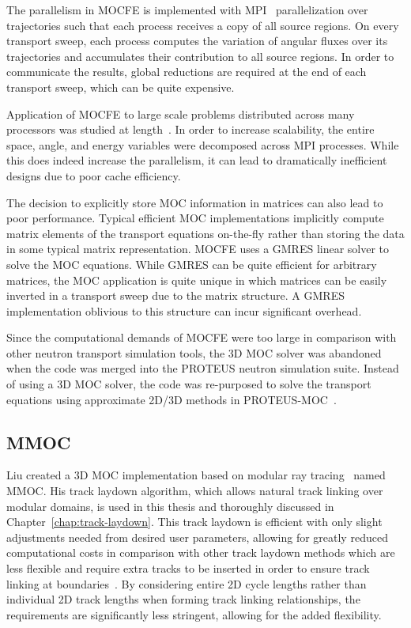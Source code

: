 The parallelism in MOCFE is implemented with \ac{MPI}~\cite{mpi} parallelization over trajectories such that each process receives a copy of all source regions. On every transport sweep, each process computes the variation of angular fluxes over its trajectories and accumulates their contribution to all source regions. In order to communicate the results, global reductions are required at the end of each transport sweep, which can be quite expensive.

Application of MOCFE to large scale problems distributed across many processors was studied at length~\cite{mocfe_bgp}. In order to increase scalability, the entire space, angle, and energy variables were decomposed across \ac{MPI} processes. While this does indeed increase the parallelism, it can lead to dramatically inefficient designs due to poor cache efficiency. 


The decision to explicitly store \ac{MOC} information in matrices can also lead to poor performance. Typical efficient \ac{MOC} implementations implicitly compute matrix elements of the transport equations on-the-fly rather than storing the data in some typical matrix representation.  MOCFE uses a \ac{GMRES} linear solver to solve the \ac{MOC} equations. While \ac{GMRES} can be quite efficient for arbitrary matrices, the  \ac{MOC} application is quite unique in which matrices can be easily inverted in a transport sweep due to the matrix structure. A \ac{GMRES} implementation oblivious to this structure can incur significant overhead.

Since the computational demands of MOCFE were too large in comparison with other neutron transport simulation tools, the 3D \ac{MOC} solver was abandoned when the code was merged into the PROTEUS neutron simulation suite. Instead of using a 3D \ac{MOC} solver, the code was re-purposed to solve the transport equations using approximate 2D/3D methods in PROTEUS-MOC~\cite{proteus}.

\subsection{MMOC}
\label{sec:mmoc}

Liu created a 3D \ac{MOC} implementation based on modular ray tracing~\cite{liu_mrt} named MMOC. His track laydown algorithm, which allows natural track linking over modular domains, is used in this thesis and thoroughly discussed in Chapter~\ref{chap:track-laydown}. This track laydown is efficient with only slight adjustments needed from desired user parameters, allowing for greatly reduced computational costs in comparison with other track laydown methods which are less flexible and require extra tracks to be inserted in order to ensure track linking at boundaries~\cite{shaner-laydown}. By considering entire 2D cycle lengths rather than individual 2D track lengths when forming track linking relationships, the requirements are significantly less stringent, allowing for the added flexibility.

